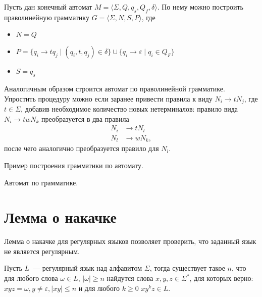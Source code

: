 Пусть дан конечный автомат $M = \langle \Sigma, Q, q_s, Q_f, \delta \rangle$. По нему можно построить праволинейную грамматику $G=\langle \Sigma, N, S, P \rangle$, где
\begin{itemize}
    \item $N = Q$
    \item $P = \{ q_i \to t q_j \mid (q_i, t, q_j)\in \delta\} \cup \{ q_i \to \varepsilon \mid q_i \in Q_F\}$
    \item $S = q_s$
\end{itemize}

Аналогичным образом строится автомат по праволинейной грамматике.
Упростить процедуру можно если заранее привести правила к виду $N_i \to tN_j$, где $t\in \Sigma$, добавив необходимое количество новых нетерминалов:
правило вида $N_i \to twN_k$ преобразуется в два правила
\begin{align*}
    N_i & \to tN_l  \\
    N_l & \to wN_k,
\end{align*}
после чего аналогично преобразуется правило для $N_l$.

Пример построения грамматики по автомату.

Автомат по грамматике.

\section{Лемма о накачке}

Лемма о накачке для регулярных языков позволяет проверить, что заданный язык не является регулярным.

\begin{lemma}
    Пусть $L$~--- регулярный язык над алфавитом $\Sigma$, тогда существует такое $n$, что для любого слова $\omega \in L$, $|\omega| \geq n$ найдутся слова $x,y,z\in \Sigma^*$, для которых верно: $xyz = \omega, y\neq \varepsilon,|xy|\leq n$ и для любого $k \geq 0$  $xy^kz \in L$.
\end{lemma}

